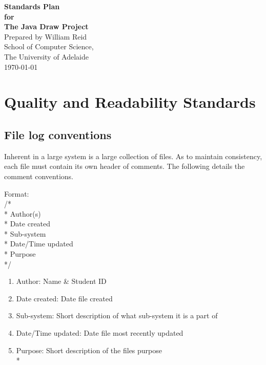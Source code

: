 \documentclass[a4paper,12pt]{article}
\begin{document}
\begin{titlepage}
\begin{center}
\vspace*{3cm}
{\LARGE\bf Standards Plan}\\
\vspace{1.5cm}
{\large\bf for}\\
\vspace{1.5cm}
{\LARGE\bf The Java Draw Project}\\
\vspace{5cm}
Prepared by William Reid\\
\vspace{1cm}
School of Computer Science,\\
The University of Adelaide\\
\vspace{1cm}
\today
\end{center}
\end{titlepage}

\section{Quality and Readability Standards}
\subsection{File log conventions}
Inherent in a large system is a large collection of files. As to maintain consistency, each file must contain its own header of comments. The following details the comment conventions.

Format:\\
/*\\
\hspace*{1.5pt} \** Author(s)\\
\hspace*{1.5pt} \** Date created\\
\hspace*{1.5pt} \** Sub-system\\
\hspace*{1.5pt} \** Date/Time updated\\
\hspace*{1.5pt} \** Purpose\\
\hspace*{1.5pt} \**/

\begin{enumerate}
\item Author: Name \& Student ID
\item Date created: Date file created
\item Sub-system: Short description of what sub-system it is a part of
\item Date/Time updated: Date file most recently updated
\item Purpose: Short description of the files purpose\\*
\end{enumerate}
\end{document}
